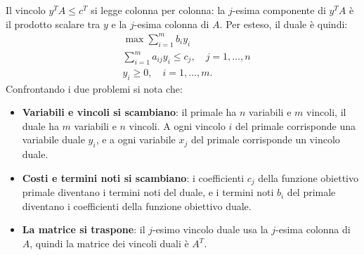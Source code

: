 Il vincolo $y^T A \le c^T$ si legge colonna per colonna: la $j$-esima componente di $y^T A$ è il prodotto scalare tra $y$ e la $j$-esima colonna di $A$. Per esteso, il duale è quindi:
\[
\begin{aligned}
&\max \sum_{i=1}^{m} b_i y_i \\
&\sum_{i=1}^{m} a_{ij} y_i \le c_j, \quad j = 1, \dots, n \\
&y_i \ge 0, \quad i = 1, \dots, m.
\end{aligned}
\]
Confrontando i due problemi si nota che:
\begin{itemize}
    \item \textbf{Variabili e vincoli si scambiano}: il primale ha $n$ variabili e $m$ vincoli, il duale ha $m$ variabili e $n$ vincoli. A ogni vincolo $i$ del primale corrisponde una variabile duale $y_i$, e a ogni variabile $x_j$ del primale corrisponde un vincolo duale.
    \item \textbf{Costi e termini noti si scambiano}: i coefficienti $c_j$ della funzione obiettivo primale diventano i termini noti del duale, e i termini noti $b_i$ del primale diventano i coefficienti della funzione obiettivo duale.
    \item \textbf{La matrice si traspone}: il $j$-esimo vincolo duale usa la $j$-esima colonna di $A$, quindi la matrice dei vincoli duali è $A^T$.
\end{itemize}

